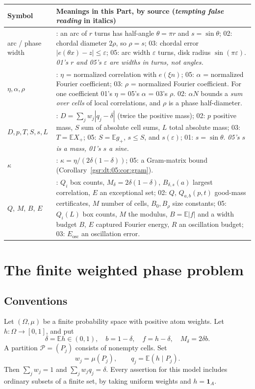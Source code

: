 \documentclass[11pt,letterpaper]{article}
\numberwithin{equation}{section}
\theoremstyle{definition}
\theoremstyle{remark}
\newcommand{\E}{\mathbb E}
\newcommand{\one}{\mathbf 1}
\newcommand{\1}{\mathbf 1}
\newcommand{\srctag}[1]{\texorpdfstring{\enspace\textup{[#1]}}{ [#1]}}
\newcommand{\srcnote}[2]{\par\noindent{\small\textit{Source #1, delivered #2.}}\par}
\begin{document}
\begin{center}\small
\begin{tabular}{@{}>{\raggedright\arraybackslash}p{} >{\raggedright\arraybackslash}p{}@{}}
\toprule
Symbol & Meanings in this Part, by source (\emph{tempting false reading} in italics)\\
\midrule
arc / phase width & 01: an arc of $r$ turns has half-angle $\theta=\pi r$ and $s=\sin\theta$; 02: chordal diameter $2\rho$, so $\rho=s$; 03: chordal error $|e(\theta x)-z|\le\varepsilon$; 05: arc width $\varepsilon$ turns, disk radius $\sin(\pi\varepsilon)$. \emph{01's $r$ and 05's $\varepsilon$ are widths in turns, not angles.}\\
$\eta,\alpha,\rho$ & 01: $\eta$ = normalized correlation with $e(\xi n)$; 05: $\alpha$ = normalized Fourier coefficient; 03: $\rho$ = normalized Fourier coefficient. For one coefficient 01's $\eta$ = 05's $\alpha$ = 03's $\rho$. 02: $\alpha N$ bounds a \emph{sum over cells} of local correlations, and $\rho$ is a phase half-diameter.\\
$D,p,T,S,s,L$ & 01: $D=\sum_jw_j|q_j-\delta|$ (twice the positive mass); 02: $p$ positive mass, $S$ sum of absolute cell sums, $L$ total absolute mass; 03: $T=\E X_+$; 05: $S=\E g_+$, $s\le S$, and $s(\varepsilon)$; 01: $s=\sin\theta$. \emph{05's $s$ is a mass, 01's $s$ a sine.}\\
$\kappa$ & 01: $\kappa=\eta/(2\delta(1-\delta))$; 05: a Gram-matrix bound (Corollary~\ref{gsr:dt:05:cor:gram}).\\
$Q$, $M$, $B$, $E$ & 01: $Q_i$ box counts, $M_\delta=2\delta(1-\delta)$, $B_{\delta,s}(a)$ largest correlation, $E$ an exceptional set; 02: $Q$, $Q_{a,b}(p,t)$ good-mass certificates, $M$ number of cells, $B_0,B_\rho$ size constants; 05: $Q_i(L)$ box counts, $M$ the modulus, $B=\E|f|$ and a width budget $B$, $E$ captured Fourier energy, $R$ an oscillation budget; 03: $E_{\mathrm{osc}}$ an oscillation error.\\
\bottomrule
\end{tabular}
\end{center}
\medskip
\section[{The finite weighted phase problem\srctag{01}}]{The finite weighted phase problem}\label{gsr:dt:01:sec:d2}\label{gsr:dt:01:sec:phase}
\srcnote{01}{Section 2}

\subsection{Conventions}
Let $(\Omega,\mu)$ be a finite probability space with positive atom weights.
Let $h:\Omega\to[0,1]$, and put
\begin{equation}\label{gsr:dt:01:eq:basic}
 \delta=\E h\in(0,1),\quad b=1-\delta,\quad f=h-\delta,
 \quad M_\delta=2\delta b.
\end{equation}
A partition $\mathcal P=(P_j)$ consists of nonempty cells. Set
\[
 w_j=\mu(P_j),\qquad q_j=\E(h\mid P_j).
\]
Then $\sum_jw_j=1$ and $\sum_jw_jq_j=\delta$.
Every assertion for this model includes ordinary subsets of a finite set,
by taking uniform weights and $h=\one_A$.
\end{document}
